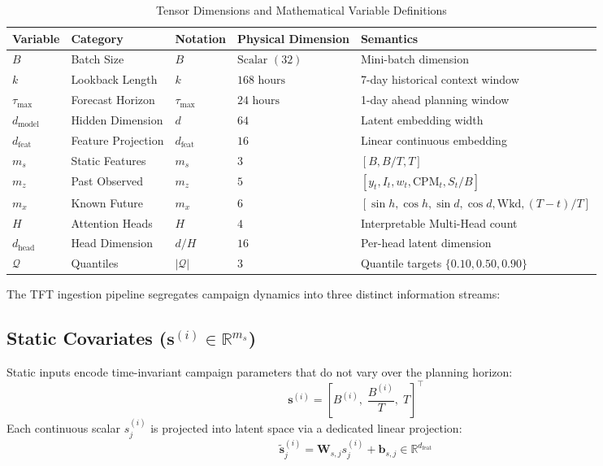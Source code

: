\documentclass[11pt,a4paper]{article}
\begin{document}
\begin{table}[h!]
\centering
\caption{Tensor Dimensions and Mathematical Variable Definitions}
\label{tab:tensor_dims}
\small
\begin{tabular}{lllll}
\toprule
\textbf{Variable} & \textbf{Category} & \textbf{Notation} & \textbf{Physical Dimension} & \textbf{Semantics} \\
\midrule
$B$ & Batch Size & $B$ & $\text{Scalar } (32)$ & Mini-batch dimension \\
$k$ & Lookback Length & $k$ & $168\text{ hours}$ & 7-day historical context window \\
$\tau_{\max}$ & Forecast Horizon & $\tau_{\max}$ & $24\text{ hours}$ & 1-day ahead planning window \\
$d_{\text{model}}$ & Hidden Dimension & $d$ & $64$ & Latent embedding width \\
$d_{\text{feat}}$ & Feature Projection & $d_{\text{feat}}$ & $16$ & Linear continuous embedding \\
$m_s$ & Static Features & $m_s$ & $3$ & $[B, B/T, T]$ \\
$m_z$ & Past Observed & $m_z$ & $5$ & $[y_t, I_t, w_t, \text{CPM}_t, S_t/B]$ \\
$m_x$ & Known Future & $m_x$ & $6$ & $[\sin h, \cos h, \sin d, \cos d, \text{Wkd}, (T-t)/T]$ \\
$H$ & Attention Heads & $H$ & $4$ & Interpretable Multi-Head count \\
$d_{\text{head}}$ & Head Dimension & $d/H$ & $16$ & Per-head latent dimension \\
$\mathcal{Q}$ & Quantiles & $|\mathcal{Q}|$ & $3$ & Quantile targets $\{0.10, 0.50, 0.90\}$ \\
\bottomrule
\end{tabular}
\end{table}

The TFT ingestion pipeline segregates campaign dynamics into three distinct information streams:

\subsection{Static Covariates (\texorpdfstring{$\mathbf{s}^{(i)} \in \mathbb{R}^{m_s}$}{s})}
Static inputs encode time-invariant campaign parameters that do not vary over the planning horizon:
\begin{equation}
    \mathbf{s}^{(i)} = \left[ B^{(i)}, \; \frac{B^{(i)}}{T}, \; T \right]^\top
\end{equation}
Each continuous scalar $s_j^{(i)}$ is projected into latent space via a dedicated linear projection:
\begin{equation}
    \tilde{\mathbf{s}}_j^{(i)} = \mathbf{W}_{s, j} s_j^{(i)} + \mathbf{b}_{s, j} \in \mathbb{R}^{d_{\text{feat}}}
\end{equation}
\end{document}
